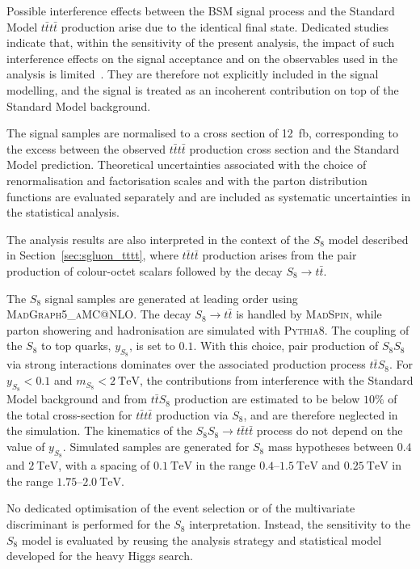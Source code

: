\begin{description}
Possible interference effects between the BSM signal process and the
Standard Model $t\bar{t}t\bar{t}$ production arise due to the identical final state.
Dedicated studies indicate that, within the sensitivity of the present analysis,
the impact of such interference effects on the signal acceptance and on the
observables used in the analysis is limited~\cite{Orlando:2258130}.
They are therefore not explicitly included in the signal modelling,
and the signal is treated as an incoherent contribution on top of the
Standard Model background.

The signal samples are normalised to a cross section of 12~fb, corresponding to 
the excess between the observed $t\bar{t}t\bar{t}$ production cross section and the Standard Model prediction.
Theoretical uncertainties associated with the choice of renormalisation and
factorisation scales and with the parton distribution functions are evaluated
separately and are included as systematic uncertainties in the statistical analysis.

\item[$S_{8}$ pair production:]
\label{subsubsec:sgluon_signal}

The analysis results are also interpreted in the context of the
$S_{8}$ model described in
Section~\ref{sec:sgluon_tttt},
where $t\bar{t}t\bar{t}$ production arises from the pair production of
colour-octet scalars followed by the decay
\(S_8 \rightarrow t\bar{t}\).

The $S_{8}$ signal samples are generated at leading order using
\textsc{MadGraph5\_aMC@NLO}.
The decay $S_8 \rightarrow t\bar{t}$ is handled by \textsc{MadSpin},
while parton showering and hadronisation are simulated with
\textsc{Pythia8}.
The coupling of the $S_{8}$ to top quarks, $y_{S_8}$, is set to $0.1$.
With this choice, pair production of $S_{8}S_{8}$ via strong interactions
dominates over the associated production process $t\bar{t}S_{8}$.
For $y_{S_8}<0.1$ and $m_{S_8}<2~\mathrm{TeV}$, the contributions from
interference with the Standard Model background and from $t\bar{t}S_{8}$
production are estimated to be below $10\%$ of the total cross-section
for $t\bar{t}t\bar{t}$ production via $S_{8}$, and are therefore neglected
in the simulation.
The kinematics of the $S_{8}S_{8} \rightarrow t\bar{t}t\bar{t}$ process do
not depend on the value of $y_{S_8}$.
Simulated samples are generated for $S_{8}$ mass hypotheses between
$0.4$ and $2~\mathrm{TeV}$, with a spacing of $0.1~\mathrm{TeV}$ in the
range $0.4$--$1.5~\mathrm{TeV}$ and $0.25~\mathrm{TeV}$ in the range
$1.75$--$2.0~\mathrm{TeV}$.

No dedicated optimisation of the event selection or of the multivariate
discriminant is performed for the $S_{8}$ interpretation.
Instead, the sensitivity to the $S_{8}$ model is evaluated by reusing the
analysis strategy and statistical model developed for the heavy Higgs
search.
\end{description}

